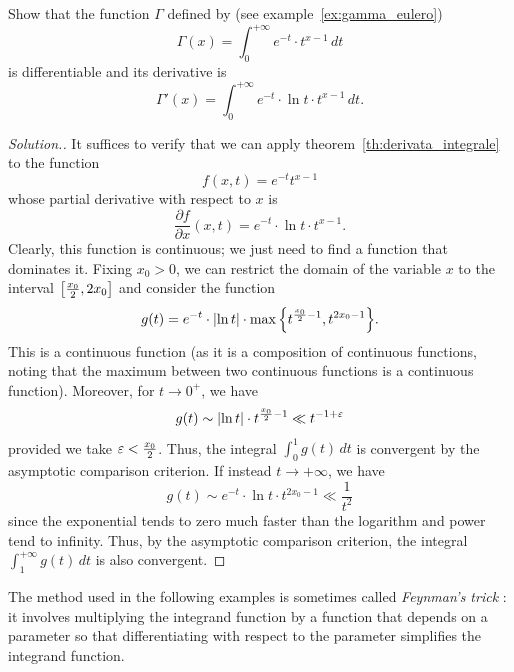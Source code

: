 \begin{exercise}
  Show that the function $\Gamma$ defined by (see example~\ref{ex:gamma_eulero})
  \[
   \Gamma(x) = \int_0^{+\infty} e^{-t}\cdot t^{x-1}\, dt 
  \]
  is differentiable and its derivative is 
  \[
  \Gamma'(x) = \int_0^{+\infty} e^{-t}\cdot \ln t \cdot t^{x-1}\, dt.  
  \]
\end{exercise}
\begin{proof}[Solution.]
It suffices to verify that we can apply theorem~\ref{th:derivata_integrale}
to the function 
\[
  f(x,t) = e^{-t}t^{x-1}
\]
whose partial derivative with respect to $x$ is 
\[
  \frac{\partial f}{\partial x}(x,t) = e^{-t}\cdot \ln t \cdot t^{x-1}.  
\]
Clearly, this function is continuous; we just need to find a function 
that dominates it. Fixing $x_0>0$, we can restrict the domain of the 
variable $x$ to the interval $\left[\frac{x_0} 2,2x_0\right]$ and consider
the function 
\[
    g(t) = e^{-t} \cdot {\left|\ln t\right|}\cdot \max{\left\{ t^{\frac {x_0} 2
  -1},t^{2x_0 -1} \right\}}.
\]
This is a continuous function (as it is a composition of continuous functions, 
noting that the maximum between two continuous functions is a continuous
function).
Moreover, for $t\to 0^+$, we have 
\[
  g(t) \sim {\left|\ln t\right|}\cdot t^{\frac{x_0}{2}-1} 
  \ll t^{-1+\varepsilon}
\]
provided we take $\varepsilon < \frac{x_0}{2}$.
Thus, the integral $\int_0^1 g(t)\, dt$ is convergent by 
the asymptotic comparison criterion.
If instead $t\to +\infty$, we have 
\[
  g(t) \sim e^{-t}\cdot \ln t \cdot t^{2x_0-1} \ll \frac{1}{t^2}  
\]
since the exponential tends to zero much faster 
than the logarithm and power tend to infinity.
Thus, by the asymptotic comparison criterion, 
the integral $\int_1^{+\infty} g(t)\, dt$ is also convergent.
\end{proof}

The method used in the following examples is sometimes called
 \emph{Feynman's trick}%
:
%
%
it involves multiplying the integrand function by a function 
that depends on a parameter so that differentiating with respect to the
parameter
simplifies the integrand function.

